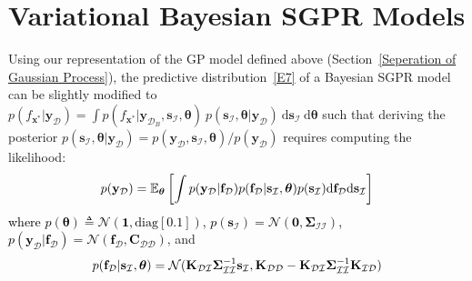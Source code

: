 \documentclass[conference]{IEEEtran}
\begin{document}
\section{Variational Bayesian SGPR Models}
\label{Variational Inference of the Bayesian DTC}%
Using our representation
of the GP model defined above (Section~\ref{Seperation of Gaussian Process}), the predictive distribution~\eqref{E7} of a Bayesian SGPR model can be slightly modified to $p(f_{\mathbf{x}^*}|\mathbf{y}_\mathcal{D})=\int p(f_{\mathbf{x}^*}|\mathbf{y}_{\mathcal{D}_B},\mathbf{s}_\mathcal{I},\boldsymbol{\theta})\ p(\mathbf{s}_\mathcal{I},\boldsymbol{\theta}|\mathbf{y}_\mathcal{D})\ \mathrm{d}\mathbf{s}_\mathcal{I}\ \mathrm{d}\boldsymbol{\theta}$ such that deriving the posterior $p(\mathbf{s}_\mathcal{I},\boldsymbol{\theta}|\mathbf{y}_\mathcal{D})=p(\mathbf{y}_\mathcal{D},\mathbf{s}_\mathcal{I},\boldsymbol{\theta})/p(\mathbf{y}_\mathcal{D})$ requires computing the likelihood:\vspace{-0.6mm}
\begin{equation}	
\hspace{0mm}
\begin{array}{c}
p(\mathbf{y}_\mathcal{D}) \hspace{-0mm}=\hspace{-0mm} \displaystyle\mathbb{E}_{\boldsymbol{\theta}}\hspace{-0mm}\left[\int \hspace{-0mm}p(\mathbf{y}_\mathcal{D}|\mathbf{f}_\mathcal{D}) p(\mathbf{f}_\mathcal{D}|\mathbf{s}_\mathcal{I},\boldsymbol{\theta}) p(\mathbf{s}_\mathcal{I})\mathrm{d}\mathbf{f}_\mathcal{D}\mathrm{d}\mathbf{s}_\mathcal{I}\right]\vspace{-0mm}
\end{array}
\label{E13}\vspace{-0.6mm}
\end{equation} 	
\textcolor{black}{where $p(\boldsymbol{\theta}) \triangleq \mathcal{N}(\mathbf{1}, \text{diag}[0.1])$, $p(\mathbf{s}_\mathcal{I})=\mathcal{N}(\mathbf{0},\mathbf{\Sigma}_\mathcal{II})$, $p(\mathbf{y}_\mathcal{D}|\mathbf{f}_\mathcal{D})=\mathcal{N}(\mathbf{f}_\mathcal{D},\mathbf{C}_{\mathcal{DD}})$}, and\vspace{-0.0mm}
\begin{equation}
\hspace{0mm}p(\mathbf{f}_\mathcal{D}|\mathbf{s}_\mathcal{I},\boldsymbol{\theta})=\displaystyle\mathcal{N}(\mathbf{K}_\mathcal{DI}\mathbf{\Sigma}_\mathcal{II}^{-1}\mathbf{s}_\mathcal{I},\mathbf{K}_\mathcal{DD} -\mathbf{K}_\mathcal{DI}\mathbf{\Sigma}_\mathcal{II}^{-1}\mathbf{K}_\mathcal{ID})
\label{Modified Gaussian Process Model}\vspace{-0.0mm}
\end{equation}
\end{document}
